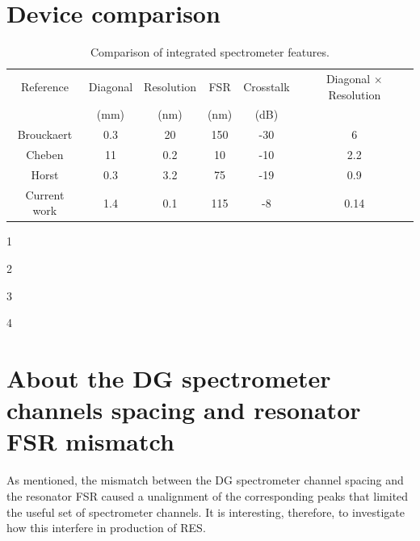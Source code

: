 \documentclass[12pt,twoside,english]{book}
\renewcommand{\~}{\perispomeni}%
\providecommand{\tabularnewline}{\\}
\numberwithin{equation}{section}
\numberwithin{figure}{section}
\begin{document}
\section{Device comparison}
\begin{table}[h]
\begin{centering}
\begin{threeparttable}[b]
\begin{tabular}{cccccc}
\hline 
Reference & Diagonal & Resolution & FSR & Crosstalk & Diagonal $\times$ Resolution\tabularnewline
      & (mm)   & (nm)    & (nm) & (dB)   & 			  \tabularnewline
\hline
\hline 
Brouckaert\tnote{1} & 0.3   & 20     & 150 & -30    & 6              \tabularnewline
Cheben\tnote{2}   & 11    & 0.2    & 10  & -10    & 2.2             \tabularnewline
Horst\tnote{3}   & 0.3   & 3.2    & 75  & -19    & 0.9             \tabularnewline
Current work\tnote{4}    & 1.4   & 0.1    & 115 & -8    & 0.14            \tabularnewline
\hline
\end{tabular}\caption{Comparison of integrated spectrometer features.\label{table:device comparison}}
\par
\begin{tablenotes}
\small
\item [1] \cite{Brouckaert:2007p82} \newline 
\item [2] \cite{Cheben:2007p133}\newline 
\item [3] \cite{Horst:2009p1764} \newline 
\item [4] \cite{Kyotoku:2010p786} 
\end{tablenotes}
\end{threeparttable}
\end{centering}
\end{table}

\section{About the DG spectrometer channels spacing and resonator FSR mismatch}
As mentioned, the mismatch between the DG spectrometer channel spacing and the resonator FSR caused a unalignment of the corresponding peaks that limited the useful set of spectrometer channels. It is interesting, therefore, to investigate how this interfere in production of RES.
\end{document}
